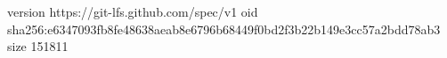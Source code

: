 version https://git-lfs.github.com/spec/v1
oid sha256:e6347093fb8fe48638aeab8e6796b68449f0bd2f3b22b149e3cc57a2bdd78ab3
size 151811
